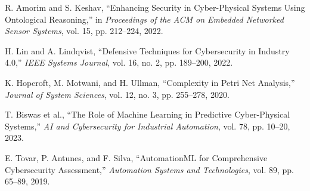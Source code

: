 \documentclass[conference]{IEEEtran}
\begin{document}
\begin{thebibliography}{15}
R. Amorim and S. Keshav, ``Enhancing Security in Cyber-Physical Systems Using Ontological Reasoning,'' in \emph{Proceedings of the ACM on Embedded Networked Sensor Systems}, vol. 15, pp. 212--224, 2022.

H. Lin and A. Lindqvist, ``Defensive Techniques for Cybersecurity in Industry 4.0,'' \emph{IEEE Systems Journal}, vol. 16, no. 2, pp. 189--200, 2022.

K. Hopcroft, M. Motwani, and H. Ullman, ``Complexity in Petri Net Analysis,'' \emph{Journal of System Sciences}, vol. 12, no. 3, pp. 255--278, 2020.

T. Biswas et al., ``The Role of Machine Learning in Predictive Cyber-Physical Systems,'' \emph{AI and Cybersecurity for Industrial Automation}, vol. 78, pp. 10--20, 2023.

E. Tovar, P. Antunes, and F. Silva, ``AutomationML for Comprehensive Cybersecurity Assessment,'' \emph{Automation Systems and Technologies}, vol. 89, pp. 65--89, 2019. 

\end{thebibliography}
\end{document}
